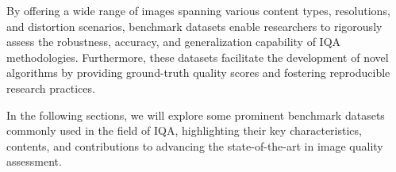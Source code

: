 By offering a wide range of images spanning various content types, resolutions, and distortion scenarios, benchmark datasets enable researchers to rigorously assess the robustness, accuracy, and generalization capability of IQA methodologies. Furthermore, these datasets facilitate the development of novel algorithms by providing ground-truth quality scores and fostering reproducible research practices. \par

In the following sections, we will explore some prominent benchmark datasets commonly used in the field of IQA, highlighting their key characteristics, contents, and contributions to advancing the state-of-the-art in image quality assessment. \par

\begin{table}[!t]
    \centering
    \caption{An overview of IQA databases}
    \label{tab:iqa_databases}
    \setlength{\tabcolsep}{0.3em}
\end{table}
